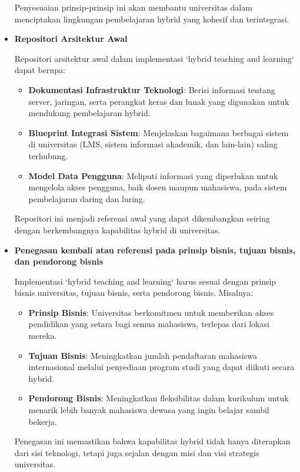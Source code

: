 \begin{itemize}
	Penyesuaian prinsip-prinsip ini akan membantu universitas dalam menciptakan lingkungan pembelajaran hybrid yang kohesif dan terintegrasi.
	
	\item \textbf{Repositori Arsitektur Awal}
	
	Repositori arsitektur awal dalam implementasi `hybrid teaching and learning` dapat berupa:
	\begin{itemize}
		\item \textbf{Dokumentasi Infrastruktur Teknologi}: Berisi informasi tentang server, jaringan, serta perangkat keras dan lunak yang digunakan untuk mendukung pembelajaran hybrid.
		\item \textbf{Blueprint Integrasi Sistem}: Menjelaskan bagaimana berbagai sistem di universitas (LMS, sistem informasi akademik, dan lain-lain) saling terhubung.
		\item \textbf{Model Data Pengguna}: Meliputi informasi yang diperlukan untuk mengelola akses pengguna, baik dosen maupun mahasiswa, pada sistem pembelajaran daring dan luring.
	\end{itemize}
	
	Repositori ini menjadi referensi awal yang dapat dikembangkan seiring dengan berkembangnya kapabilitas hybrid di universitas.
	
	\item \textbf{Penegasan kembali atau referensi pada prinsip bisnis, tujuan bisnis, dan pendorong bisnis}
	
	Implementasi `hybrid teaching and learning` harus sesuai dengan prinsip bisnis universitas, tujuan bisnis, serta pendorong bisnis. Misalnya:
	\begin{itemize}
		\item \textbf{Prinsip Bisnis}: Universitas berkomitmen untuk memberikan akses pendidikan yang setara bagi semua mahasiswa, terlepas dari lokasi mereka.
		\item \textbf{Tujuan Bisnis}: Meningkatkan jumlah pendaftaran mahasiswa internasional melalui penyediaan program studi yang dapat diikuti secara hybrid.
		\item \textbf{Pendorong Bisnis}: Meningkatkan fleksibilitas dalam kurikulum untuk menarik lebih banyak mahasiswa dewasa yang ingin belajar sambil bekerja.
	\end{itemize}
	
	Penegasan ini memastikan bahwa kapabilitas hybrid tidak hanya diterapkan dari sisi teknologi, tetapi juga sejalan dengan misi dan visi strategis universitas.
	

\end{itemize}
